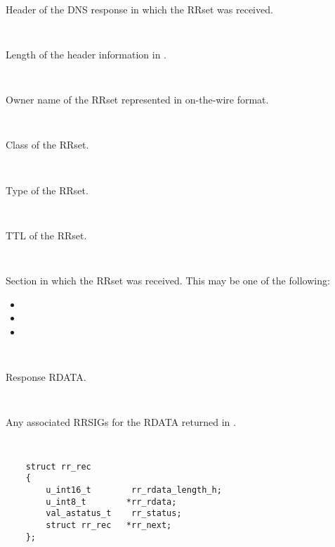 \begin{description}
\begin{description}
\item {}\verb" "

Header of the DNS response in which the RRset was received.

\item {}\verb" "

Length of the header information in .

\item {}\verb" "

Owner name of the RRset represented in on-the-wire format.

\item {}\verb" "

Class of the RRset.

\item {}\verb" "

Type of the RRset.

\item {}\verb" "

TTL of the RRset.

\item {}\verb" "

Section in which the RRset was received.  This may be one of the following:
\begin{itemize}
\item {}
\item {}
\item {}
\end{itemize}

\item {}\verb" "

Response RDATA.

\item {}\verb" "

Any associated RRSIGs for the RDATA returned in .

\end{description}

\item {}\verb" "

\begin{verbatim}
    struct rr_rec
    {
        u_int16_t        rr_rdata_length_h;
        u_int8_t        *rr_rdata;
        val_astatus_t    rr_status;
        struct rr_rec   *rr_next;
    };
\end{verbatim}


\end{description}
